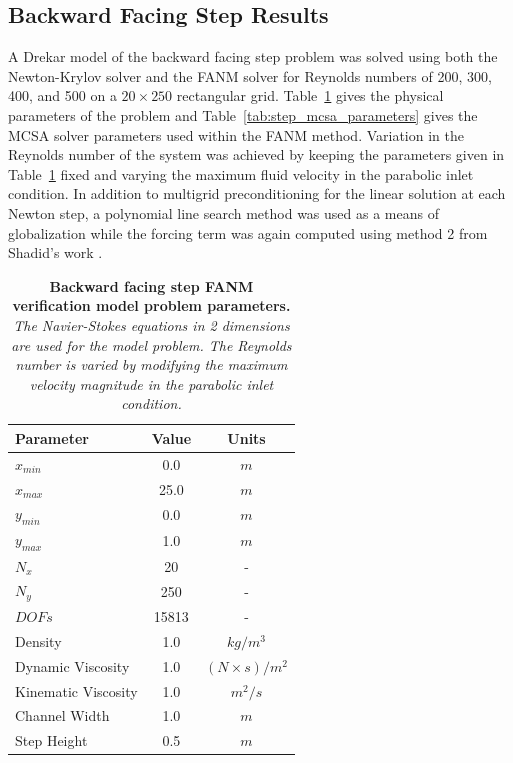 \clearpage

\subsection{Backward Facing Step Results}
\label{subsec:backward_step_verification}

A Drekar model of the backward facing step problem was solved using
both the Newton-Krylov solver and the FANM solver for Reynolds numbers
of 200, 300, 400, and 500 on a $20 \times 250$ rectangular
grid. Table~\ref{tab:backward_step_parameters} gives the physical
parameters of the problem and Table~\ref{tab:step_mcsa_parameters}
gives the MCSA solver parameters used within the FANM
method. Variation in the Reynolds number of the system was achieved by
keeping the parameters given in
Table~\ref{tab:backward_step_parameters} fixed and varying the maximum
fluid velocity in the parabolic inlet condition. In addition to
multigrid preconditioning for the linear solution at each Newton step,
a polynomial line search method was used as a means of globalization
while the forcing term was again computed using method 2 from Shadid's
work \cite{shadid_inexact_1997}.

\begin{table}[h!]
  \begin{center}
    \begin{tabular}{lcc}\hline\hline
      \multicolumn{1}{l}{Parameter}& 
      \multicolumn{1}{c}{Value}&
      \multicolumn{1}{c}{Units}\\\hline
      $x_{min}$ & 0.0 & $m$ \\
      $x_{max}$ & 25.0 & $m$ \\
      $y_{min}$ & 0.0 & $m$ \\
      $y_{max}$ & 1.0 & $m$ \\
      $N_x$ & 20 & - \\
      $N_y$ & 250 & - \\
      $DOFs$ & 15813 & - \\
      Density & 1.0 & $kg / m^3$ \\
      Dynamic Viscosity & 1.0 & $(N \times s) / m^2$ \\
      Kinematic Viscosity & 1.0 & $m^2 / s$ \\
      Channel Width & 1.0 & $m$ \\
      Step Height & 0.5 & $m$ \\
      \hline\hline
    \end{tabular}
  \end{center}
  \caption{\textbf{Backward facing step FANM verification model
      problem parameters.}  \textit{The Navier-Stokes equations in 2
      dimensions are used for the model problem. The Reynolds number
      is varied by modifying the maximum velocity magnitude in the
      parabolic inlet condition.}}
  \label{tab:backward_step_parameters}
\end{table}

